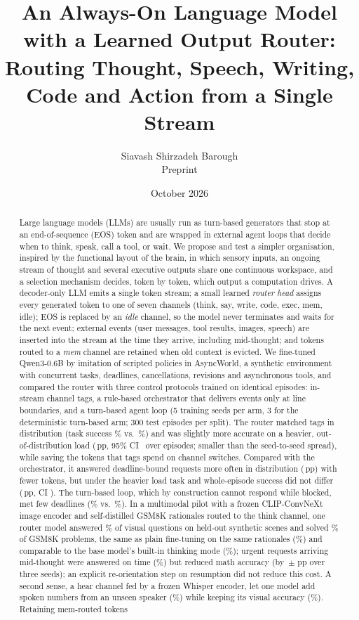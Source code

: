 \documentclass[10pt]{article}
\title{An Always-On Language Model with a Learned Output Router:\\
Routing Thought, Speech, Writing, Code and Action from a Single Stream}
\author{Siavash Shirzadeh Barough\\\small Preprint}
\date{\small October 2026}
\begin{document}
\maketitle

\begin{abstract}
Large language models (LLMs) are usually run as turn-based generators that stop at an end-of-sequence (EOS) token and are wrapped in external agent loops that decide when to think, speak, call a tool, or wait. We propose and test a simpler organisation, inspired by the functional layout of the brain, in which sensory inputs, an ongoing stream of thought and several executive outputs share one continuous workspace, and a selection mechanism decides, token by token, which output a computation drives. A decoder-only LLM emits a single token stream; a small learned \emph{router head} assigns every generated token to one of seven channels (think, say, write, code, exec, mem, idle); EOS is replaced by an \emph{idle} channel, so the model never terminates and waits for the next event; external events (user messages, tool results, images, speech) are inserted into the stream at the time they arrive, including mid-thought; and tokens routed to a \emph{mem} channel are retained when old context is evicted. We fine-tuned Qwen3-0.6B by imitation of scripted policies in AsyncWorld, a synthetic environment with concurrent tasks, deadlines, cancellations, revisions and asynchronous tools, and compared the router with three control protocols trained on identical episodes: in-stream channel tags, a rule-based orchestrator that delivers events only at line boundaries, and a turn-based agent loop (5 training seeds per arm, 3 for the deterministic turn-based arm; 300 test episodes per split). The router matched tags in distribution (task success \routeridtask\% vs.\ \tagsidtask\%) and was slightly more accurate on a heavier, out-of-distribution load (\dtagsstresstask\,pp, 95\% CI \dtagsstresstaskci\ over episodes; smaller than the seed-to-seed spread), while saving the tokens that tags spend on channel switches. Compared with the orchestrator, it answered deadline-bound requests more often in distribution (\dorchidquick\,pp) with fewer tokens, but under the heavier load task and whole-episode success did not differ (\dorchstresstask\,pp, CI \dorchstresstaskci). The turn-based loop, which by construction cannot respond while blocked, met few deadlines (\turnidquick\% vs.\ \routeridquick\%). In a multimodal pilot with a frozen CLIP-ConvNeXt image encoder and self-distilled GSM8K rationales routed to the think channel, one router model answered \visall\% of visual questions on held-out synthetic scenes and solved \gsmsolo\% of GSM8K problems, the same as plain fine-tuning on the same rationales (\gsmsft\%) and comparable to the base model's built-in thinking mode (\gsmbasethink\%); urgent requests arriving mid-thought were answered on time (\gsmasyncquick\%) but reduced math accuracy (by \mmseedvdiff\,$\pm$\,\mmseedvdiffsd\,pp over three seeds); an explicit re-orientation step on resumption did not reduce this cost. A second sense, a hear channel fed by a frozen Whisper encoder, let one model add spoken numbers from an unseen speaker (\avavmlisten\%) while keeping its visual accuracy (\avavmvis\%). Retaining mem-routed tokens 
\end{abstract}
\end{document}
